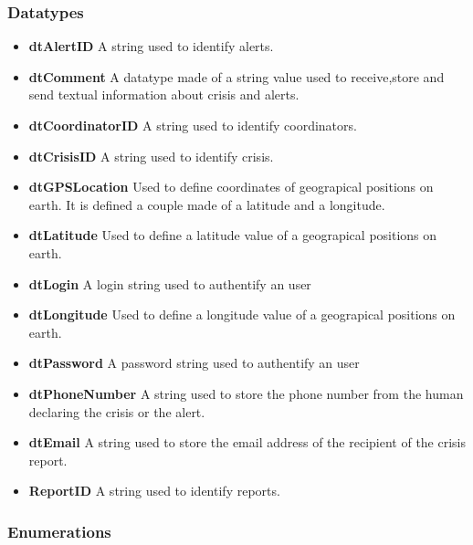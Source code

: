 \subsubsection{Datatypes}
\begin{itemize}
	\item \textbf{dtAlertID}
	A string used to identify alerts.
	
	\item \textbf{dtComment}
	A datatype made of a string value used to receive,store and send
	textual information about crisis and alerts.
	
	\item \textbf{dtCoordinatorID}
	A string used to identify coordinators.
	
	\item \textbf{dtCrisisID}
	A string used to identify crisis.
	
	\item \textbf{dtGPSLocation}
	Used to define coordinates of geograpical positions on earth. It
	is defined a couple made of a latitude and a longitude.
	
	\item \textbf{dtLatitude}
	Used to define a latitude value of a geograpical positions on earth.
	
	\item \textbf{dtLogin}
	A login string used to authentify an \msricrash user
	
	\item \textbf{dtLongitude}
	Used to define a longitude value of a geograpical positions on
	earth.
	
	\item \textbf{dtPassword}
	A password string used to authentify an \msricrash user
	
	\item \textbf{dtPhoneNumber}
	A string used to store the phone number from the human declaring
	the crisis or the alert.
	
	\item \textbf{dtEmail}
	A string used to store the email address of the recipient of the crisis
	report.
	
	\item \textbf{ReportID}
	A string used to identify reports.
\end{itemize}
\subsubsection{Enumerations}

